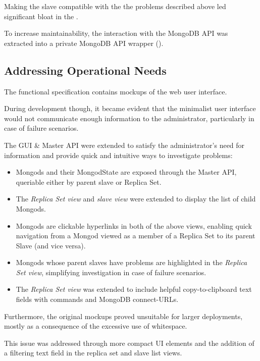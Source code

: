 Making the slave compatible with the the problems described above led significant bloat in the .

To increase maintainability, the interaction with the MongoDB API was extracted into a private MongoDB API wrapper ().

\subsection{Addressing Operational Needs}

The functional specification contains mockups of the \mamid web user interface.

During development though, it became evident that the minimalist user interface would not communicate enough information
to the administrator, particularly in case of failure scenarios.

The GUI \& Master API were extended to satisfy the administrator's need for information and provide
quick and intuitive ways to investigate problems:

\begin{itemize}
  \item Mongods and their MongodState are exposed through the Master API, queriable either by parent slave or Replica Set.
  \item The \textit{Replica Set view} and \textit{slave view} were extended to display the list of child Mongods.
  \item Mongods are clickable hyperlinks in both of the above views, enabling quick navigation from a Mongod
          viewed as a member of a Replica Set to its parent Slave (and vice versa).
  \item Mongods whose parent slaves have problems are highlighted in the \textit{Replica Set view},
          simplifying investigation in case of failure scenarios.
  \item The \textit{Replica Set view} was extended to include helpful copy-to-clipboard text fields with commands and MongoDB connect-URLs.
\end{itemize}

Furthermore, the original mockups proved unsuitable for larger deployments, mostly as a consequence of the excessive use of whitespace.

This issue was addressed through more compact UI elements and the addition of a filtering text field in the replica set and slave list views.

